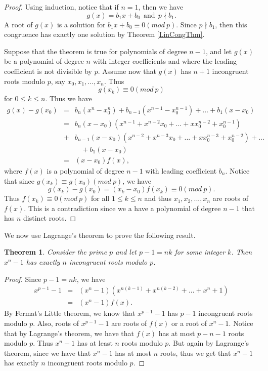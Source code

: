 \documentclass[12pt,letterpaper]{book}
\newtheorem{theorem}{Theorem}
\begin{document}
\begin{proof}
Using induction, notice that if $n=1$, then we have
\begin{equation*}
g(x)=b_1x+b_0 \ \ \mbox{and} \ \ p \nmid b_1.
\end{equation*}
A root of $g(x)$ is a solution for $b_1x+b_0\equiv 0(mod \ p)$.  Since
$p\nmid b_1$, then this congruence has exactly one solution by
Theorem \ref{LinCongThm}.
\par Suppose that the theorem is true for polynomials of degree
$n-1$, and let $g(x)$ be a polynomial of degree $n$ with integer
coefficients and where the leading coefficient is not divisible by
$p$.  Assume now that $g(x)$ has $n+1$ incongruent roots modulo $p$,
say $x_0,x_1,...,x_{n}$.  Thus
\begin{equation*}
g(x_k)\equiv 0(mod \ p)
\end{equation*}
for $0\leq k\leq n$. Thus we have
\begin{eqnarray*}
g(x)-g(x_0)&=&b_n(x^n-x_0^n)+b_{n-1}(x^{n-1}-x_0^{n-1})+...+b_1(x-x_0)
\\ &=&
b_n(x-x_0)(x^{n-1}+x^{n-2}x_0+...+xx_0^{n-2}+x_0^{n-1})\\&+&
b_{n-1}(x-x_0)(x^{n-2}+x^{n-3}x_0+...+xx_0^{n-3}+x_0^{n-2})+...\\
&&~~~~+b_1(x-x_0)\\
&=&(x-x_0)f(x),
\end{eqnarray*}
where $f(x)$ is a polynomial of degree $n-1$ with leading
coefficient $b_n$.  Notice that since $g(x_k)\equiv g(x_0)(mod \
p)$, we have
\begin{equation*}
g(x_k)-g(x_0)=(x_k-x_0)f(x_k)\equiv 0(mod \ p).
\end{equation*}
Thus $f(x_k)\equiv 0(mod \ p)$ for all $1\leq k\leq n$ and thus
$x_1,x_2,...,x_n$ are roots of $f(x)$.  This is a contradiction
since we a have a polynomial of degree $n-1$ that has $n$ distinct
roots.
\end{proof}

We now use Lagrange's theorem to prove the following result.

\begin{theorem}\label{IncongruentRoots}
Consider the prime $p$ and let $p-1=nk$ for some integer $k$. Then
$x^n-1$ has exactly $n$ incongruent roots modulo $p$.
\end{theorem}

\begin{proof}
Since $p-1=nk$, we have
\begin{eqnarray*}
x^{p-1}-1&=&(x^n-1)(x^{n(k-1)}+x^{n(k-2)}+...+x^n+1)
\\&=&(x^n-1)f(x).
\end{eqnarray*}
By Fermat's Little theorem, we know that $x^{p-1}-1$ has $p-1$
incongruent roots modulo $p$.   Also, roots of $x^{p-1}-1$ are roots
of $f(x)$ or a root of $x^n-1$.  Notice that by Lagrange's theorem,
we have that $f(x)$ has at most $p-n-1$ roots modulo $p$. Thus
$x^n-1$ has at least $n$ roots modulo $p$. But again by Lagrange's
theorem, since we have that $x^n-1$ has at most $n$ roots, thus we
get that $x^n-1$ has exactly $n$ incongruent roots modulo $p$.
\end{proof}
\end{document}
